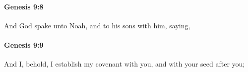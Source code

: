 		\paragraph{Genesis 9:8} %
			\label{GENESIS-9-8}

			And God spake unto Noah, and to his sons with him, saying,


		\paragraph{Genesis 9:9} %
			\label{GENESIS-9-9}

			And I, behold, I establish my covenant with you, and with your seed after you;


